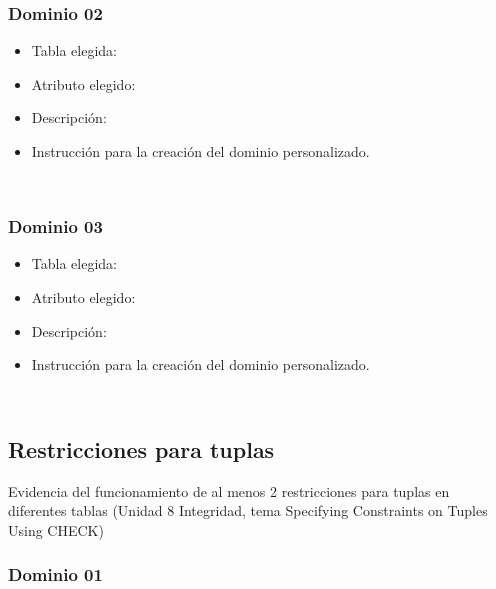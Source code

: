 \subsubsection*{Dominio 02}

\begin{itemize}
    \item Tabla elegida: 
    \item Atributo elegido: 
    \item Descripción: 
    \item Instrucción para la creación del dominio personalizado.
    \begin{lstlisting}[caption={Tablas para la BdDatos}, label={lst:sql_estadios}]
    
    \end{lstlisting}
\end{itemize}


\subsubsection*{Dominio 03}

\begin{itemize}
    \item Tabla elegida: 
    \item Atributo elegido: 
    \item Descripción: 
    \item Instrucción para la creación del dominio personalizado.
    \begin{lstlisting}[caption={Tablas para la BdDatos}, label={lst:sql_estadios}]
    
    \end{lstlisting}
\end{itemize}



\subsection{Restricciones para tuplas}

Evidencia del funcionamiento de al menos 2 restricciones para tuplas en diferentes tablas (Unidad 8 Integridad, tema Specifying Constraints on Tuples Using CHECK)


\subsubsection*{Dominio 01}


